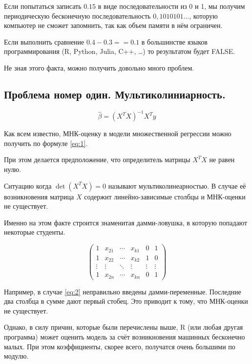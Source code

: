 \documentclass[10pt,a4paper]{article}
\begin{document}
Если попытаться записать $0.15$ в виде последовательности из 0 и 1, мы получим периодическую бесконечную последовательность $0,1010101 \dots$, которую компьютер не сможет запомнить, так как объем памяти в нём ограничен.

Если выполнить сравнение $0.4 - 0.3 == 0.1$ в большинстве языков программирования (R, Python, Julia, C++, \ldots) то результатом будет FALSE.

Не зная этого факта, можно получить довольно много проблем.

\subsection{Проблема номер один. Мультиколиниарность.}

\[ \hat {\beta} = (X^T X)^{-1} X^T y \label{eq:1} \] 

Как всем известно, МНК-оценку в модели множественной регрессии можно получить по формуле \eqref{eq:1}.


При этом делается предположение, что определитель матрицы $X^T X$ не равен нулю. 

Ситуацию когда $\det (X^T X) = 0$ называют мультиколинеарностью. В случае её возникновения матрица  $X$ содержит линейно-зависимые столбцы и МНК-оценки не существует. 

Именно на этом факте строится знаменитая дамми-ловушка, в которую попадают некоторые студенты.


\begin{equation} \label{eq:2} 
\begin{pmatrix}
1    & x_{21}    & \cdots  & x_{k1}  & 0      & 1      \\
1    & x_{22}    & \cdots  & x_{k2}  & 1      & 0      \\
\vdots & \vdots    & \ddots  & \vdots  & \vdots & \vdots \\
1    & x_{2n}    & \cdots  & x_{kn}  & 0       & 1   
\end{pmatrix}
\end{equation}

Например, в случае \eqref{eq:2} неправильно введены дамми-переменные. Последние два столбца в сумме дают первый стобец. Это приводит к тому, что МНК-оценки не существует. 

Однако, в силу причин, которые были перечислены выше, R (или любая другая программа) может оценить модель за счёт возникновения машинных бесконечно малых. При этом коэффициенты, скорее всего, получатся очень большими по модулю. 
\end{document}
